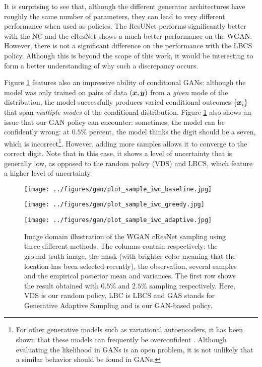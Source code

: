It is surprising to see that, although the different generator architectures have roughly the same number of parameters, they can lead to very different performance when used as policies. The ResUNet performs significantly better with the NC and the cResNet shows a much better performance on the WGAN. However, there is not a significant difference on the performance with the LBCS policy. Although this is beyond the scope of this work, it would be interesting to form a better understanding of why such a discrepancy occurs.

Figure \ref{fig:mnist_image} features also an impressive ability of conditional GANs: although the model was only trained on pairs of data $({\bm{x}},{\bm{y}})$ from a \textit{given} mode of the distribution, the model successfully produces varied conditional outcomes $\{{\bm{x}}_i\}$ that span \textit{multiple modes} of the conditional distribution. Figure \ref{fig:mnist_image} also shows an issue that our GAN policy can encounter: sometimes, the model can be confidently wrong: at $0.5\%$ percent, the model thinks the digit should be a seven, which is incorrect\footnote{For other generative models such as variational autoencoders, it has been shown that these models can frequently be overconfident \citep{nalisnick2018deep}. Although evaluating the likelihood in GANs is an open problem, it is not unlikely that a similar behavior should be found in GANs.}. However, adding more samples allows it to converge to the correct digit. Note that in this case, it shows a level of uncertainty that is generally low, as opposed to the random policy (VDS) and LBCS, which feature a higher level of uncertainty.

%
\begin{figure}[!ht]
    \centering

    \texttt{[image: ../figures/gan/plot\_sample\_iwc\_baseline.jpg]}
    
    \texttt{[image: ../figures/gan/plot\_sample\_iwc\_greedy.jpg]}
    
    \texttt{[image: ../figures/gan/plot\_sample\_iwc\_adaptive.jpg]}

\caption{Image domain illustration of the WGAN cResNet sampling using three different methods. The columns contain respectively: the ground truth image, the mask (with brighter color meaning that the location has been selected recently), the observation, several samples and the empirical posterior mean and variances. The first row shows the result obtained with $0.5\%$ and $2.5\%$ sampling respectively. Here, VDS is our random policy, LBC is LBCS and GAS stands for Generative Adaptive Sampling and is our GAN-based policy.}\label{fig:mnist_image}
\end{figure}



